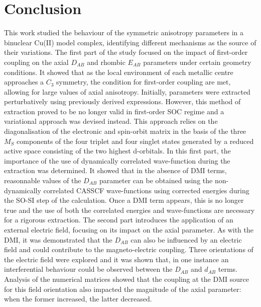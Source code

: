 \documentclass[12pt,a4paper]{report}
\numberwithin{equation}{section}
\begin{document}
\newpage
\section{Conclusion}

This work studied the behaviour of the symmetric anisotropy parameters in a binuclear Cu(II) model complex, identifying different mechanisms as the source of their variations.
The first part of the study focused on the impact of first-order coupling on the axial $D_{AB}$ and rhombic $E_{AB}$ parameters under certain geometry conditions.
It showed that as the local environment of each metallic centre approaches a $C_3$ symmetry, the condition for first-order coupling are met, allowing for large values of axial anisotropy.
Initially,  parameters were extracted perturbatively using previously derived expressions. 
However, this method of extraction proved to be no longer valid in first-order SOC regime and a variational approach was devised instead.
This approach relies on the diagonalisation of the electronic and spin-orbit matrix in the basis of the three $M_S$ components of the four triplet and four singlet states generated by a reduced active space consisting of the two highest d-orbitals.
In this first part, the importance of the use of dynamically correlated wave-function during the extraction was determined.
It showed that in the absence of DMI terms, reasonnable values of the $D_{AB}$ parameter can be obtained using the non-dynamically correlated CASSCF wave-functions using corrected energies during the SO-SI step of the calculation.
Once a DMI term appears, this is no longer true and the use of both the correlated energies and wave-functions are necessary for a rigorous extraction.
The second part introduces the application of an external electric field, focusing on its impact on the axial parameter.
As with the DMI, it was demonstrated that the $D_{AB}$ can also be influenced by an electric field and could contribute to the magneto-electric coupling.
Three orientations of the electric field were explored and it was shown that, in one instance an interferential behaviour could be observed between the $D_{AB}$ and $d_{AB}$ terms.
Analysis of the numerical matrices showed that the coupling at the DMI source for this field orientation also impacted the magnitude of the axial parameter: when the former increased, the latter decreased.
\end{document}
